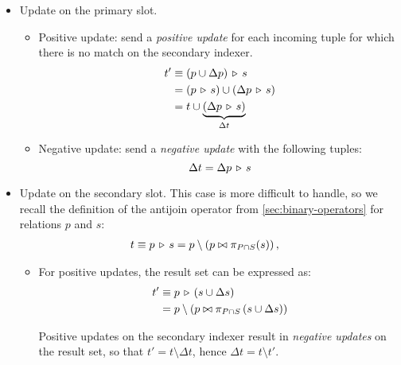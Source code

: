 \begin{itemize}
	\item Update on the primary slot.
	\begin{itemize}
		\item Positive update: send a \emph{positive update} for each incoming tuple for which there is no match on the secondary indexer.
		\begin{align*}
			t'       & \equiv \left(p \cup \Delta p\right) \, \triangleright \, s               \\
			         & = (p \, \triangleright \, s) \cup (\Delta p \, \triangleright \, s) \\
			         & = t \cup \underbrace{(\Delta p \, \triangleright \, s)}_{\Delta t}
		\end{align*}

		\item Negative update: send a \emph{negative update} with the following tuples:
		$$ \Delta t = \Delta p \, \triangleright \, s $$
	\end{itemize}

	\item Update on the secondary slot. This case is more difficult to handle, so we recall the definition of the antijoin operator from \autoref{sec:binary-operators} for relations $p$ and $s$:
	\begin{align*}
		t & \equiv p \, \triangleright \, s = p \setminus \left(p \bowtie \pi_{P \cap S} (s)\right),
	\end{align*}





	\begin{itemize}
		\item For positive updates, the result set can be expressed as:
		\begin{align*}
			t'       & \equiv p \, \triangleright \, \left(s \cup \Delta s\right) \\
			         & = p \setminus \left( p \bowtie \pi_{P \cap S} \left(s \cup \Delta s\right) \right)
		\end{align*}

		Positive updates on the secondary indexer result in \emph{negative updates} on the result set, so that $t' = t \setminus \Delta t$, hence $\Delta t = t \setminus t'$.


\end{itemize}
\end{itemize}
